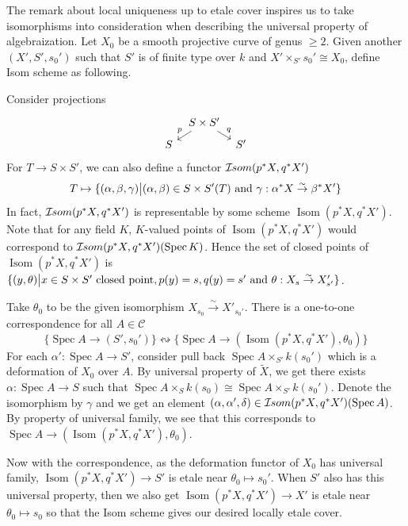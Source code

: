 \documentclass{ctexart}
\newcommand{\spec}{\operatorname{Spec}}
\newcommand{\isomorphismscheme}{\operatorname{Isom}}
\newcommand{\isomorphismfunctor}{\mathcal{I}\kern -.5pt som}
\begin{document}
The remark about local uniqueness up to etale cover inspires us to take isomorphisms into consideration when describing the universal property of algebraization.
Let $X_{0}$ be a smooth projective curve of genus $\ge 2$.
Given another $(X', S', s_{0}')$ such that $S'$ is of finite type over $k$ and $X' \times_{S'} s_{0}' \cong X_{0}$, 
define Isom scheme as following.
\par
Consider projections
\begin{equation}
    \begin{tikzcd}[sep = tiny]
        & S \times S' \arrow[dr, "q"] \arrow[dl, "p" swap] & \\
        S &&
        S'
    \end{tikzcd}
\end{equation}
For $T \rightarrow S \times S'$, we can also define a functor $\isomorphismfunctor(p^{\ast}X, q^{\ast}X')$
\begin{equation*}
    T \mapsto \{(\alpha, \beta, \gamma) \big{|} (\alpha, \beta)\in S \times S'(T) \text{ and } \gamma: \alpha^{\ast}X \overset{\sim}{\rightarrow} \beta^{\ast}X'\}
\end{equation*}
In fact, $\isomorphismfunctor(p^{\ast}X, q^{\ast}X')$ is representable by some scheme $\isomorphismscheme(p^{\ast}X, q^{\ast}X')$.
Note that for any field $K$, $K$-valued points of $\isomorphismscheme(p^{\ast}X, q^{\ast}X')$ would correspond to $\isomorphismfunctor(p^{\ast}X, q^{\ast}X')(\spec K)$.
Hence the set of closed points of $\isomorphismscheme(p^{\ast}X, q^{\ast}X')$ is $\{(y, \theta) \big{|} x\in S \times S' \text{ closed point}, p(y) = s, q(y) = s' \text{ and } \theta: X_{s} \overset{\sim}{\rightarrow} X'_{s'}\}$.
\par
Take $\theta_{0}$ to be the given isomorphism $X_{s_{0}} \overset{\sim}{\rightarrow} X'_{s_{0}'}$.
There is a one-to-one correspondence for all $A\in \mathscr{C}$
\begin{equation*}
    \{\spec A \rightarrow (S', s_{0}')\} \leftrightsquigarrow \{\spec A \rightarrow (\isomorphismscheme(p^{\ast}X, q^{\ast}X'), \theta_{0})\}
\end{equation*}
For each $\alpha': \spec A \rightarrow S'$, consider pull back $\spec A \times_{S'} k(s_{0}')$ which is a deformation of $X_{0}$ over $A$.
By universal property of $\widetilde{X}$, we get there exists $\alpha: \spec A \rightarrow S$ such that $\spec A \times_{S} k(s_{0}) \cong \spec A \times_{S'} k(s_{0}')$.
Denote the isomorphism by $\gamma$ and we get an element $(\alpha, \alpha', \delta)\in \isomorphismfunctor(p^{\ast}X, q^{\ast}X')(\spec A)$.
By property of universal family, we see that this corresponds to $\spec A \rightarrow (\isomorphismscheme(p^{\ast}X, q^{\ast}X'), \theta_{0})$.
\par
Now with the correspondence, as the deformation functor of $X_{0}$ has universal family, $\isomorphismscheme(p^{\ast}X, q^{\ast}X') \rightarrow S'$ is etale near $\theta_{0} \mapsto s_{0}'$.
When $S'$ also has this universal property, then we also get $\isomorphismscheme(p^{\ast}X, q^{\ast}X') \rightarrow X'$ is etale near $\theta_{0} \mapsto s_{0}$ so that the Isom scheme gives our desired locally etale cover.
\end{document}
